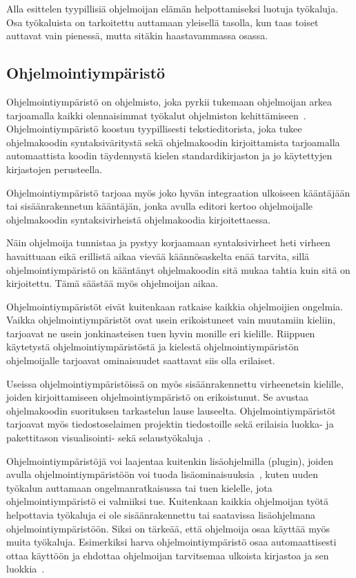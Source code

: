 \documentclass[finnish]{tktltiki2}
\theoremstyle{definition}
\theoremstyle{remark}
\begin{document}
Alla esittelen tyypillisiä ohjelmoijan elämän helpottamiseksi luotuja työkaluja. Osa työkaluista on tarkoitettu auttamaan yleisellä tasolla, kun taas toiset auttavat vain pienessä, mutta sitäkin haastavammassa osassa.

\subsection{Ohjelmointiympäristö}
Ohjelmointiympäristö on ohjelmisto, joka pyrkii tukemaan ohjelmoijan arkea tarjoamalla kaikki olennaisimmat työkalut ohjelmiston kehittämiseen~\cite{eclipse-ide}. Ohjelmointiympäristö koostuu tyypillisesti tekstieditorista, joka tukee ohjelmakoodin syntaksiväritystä sekä ohjelmakoodin kirjoittamista tarjoamalla automaattista koodin täydennystä kielen standardikirjaston ja jo käytettyjen kirjastojen perusteella.

Ohjelmointiympäristö tarjoaa myös joko hyvän integraation ulkoiseen kääntäjään tai sisäänrakennetun kääntäjän, jonka avulla editori kertoo ohjelmoijalle ohjelmakoodin syntaksivirheistä ohjelmakoodia kirjoitettaessa.

Näin ohjelmoija tunnistaa ja pystyy korjaamaan syntaksivirheet heti virheen havaittuaan eikä erillistä aikaa vievää käännösaskelta enää tarvita, sillä ohjelmointiympäristö on kääntänyt ohjelmakoodin sitä mukaa tahtia kuin sitä on kirjoitettu. Tämä säästää myös ohjelmoijan aikaa.

Ohjelmointiympäristöt eivät kuitenkaan ratkaise kaikkia ohjelmoijien ongelmia. Vaikka ohjelmointiympäristöt ovat usein erikoistuneet vain muutamiin kieliin, tarjoavat ne usein jonkinasteisen tuen hyvin monille eri kielille. Riippuen käytetystä ohjelmointiympäristöstä ja kielestä ohjelmointiympäristön ohjelmoijalle tarjoavat ominaisuudet saattavat siis olla erilaiset.

Useissa ohjelmointiympäristöissä on myös sisäänrakennettu virheenetsin kielille, joiden kirjoittamiseen ohjelmointiympäristö on erikoistunut. Se avustaa ohjelmakoodin suorituksen tarkastelun lause lauseelta. Ohjelmointiympäristöt tarjoavat myös tiedostoselaimen projektin tiedostoille sekä erilaisia luokka- ja pakettitason visualisointi- sekä selaustyökaluja~\cite{eclipse-ide}.

Ohjelmointiympäristöjä voi laajentaa kuitenkin lisäohjelmilla (plugin), joiden avulla ohjelmointiympäristöön voi tuoda lisäominaisuuksia~\cite{eclipse-ide}, kuten uuden työkalun auttamaan ongelmanratkaisussa tai tuen kielelle, jota ohjelmointiympäristö ei valmiiksi tue. Kuitenkaan kaikkia ohjelmoijan työtä helpottavia työkaluja ei ole sisäänrakennettu tai saatavissa lisäohjelmana ohjelmointiympäristöön. Siksi on tärkeää, että ohjelmoija osaa käyttää myös muita työkaluja. Esimerkiksi harva ohjelmointiympäristö osaa automaattisesti ottaa käyttöön ja
ehdottaa ohjelmoijan tarvitsemaa ulkoista kirjastoa ja sen luokkia~\cite{jungloid-mining}.
\end{document}
